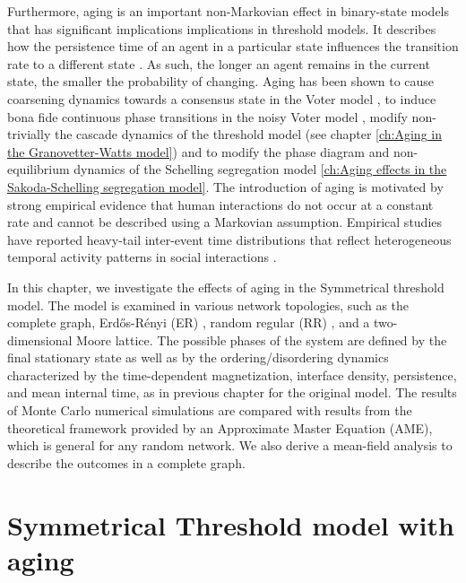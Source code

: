 Furthermore, aging is an important non-Markovian effect in binary-state models that has significant implications implications in threshold models. It describes how the persistence time of an agent in a particular state influences the transition rate to a different state \cite{stark-2008, fernandez-gracia-2011, perez-2016, boguna-2014, chen-2020}. As such, the longer an agent remains in the current state, the smaller the probability of changing. Aging has been shown to cause coarsening dynamics towards a consensus state in the Voter model \cite{fernandez-gracia-2011,peralta-2020C}, to induce bona fide continuous phase transitions in the noisy Voter model \cite{artime-2018,peralta-2020A}, modify non-trivially the cascade dynamics of the threshold model (see chapter \ref{ch:Aging in the Granovetter-Watts model}) and to modify the phase diagram and non-equilibrium dynamics of the Schelling segregation model \ref{ch:Aging effects in the Sakoda-Schelling segregation model}. The introduction of aging is motivated by strong empirical evidence that human interactions do not occur at a constant rate and cannot be described using a Markovian assumption. Empirical studies have reported heavy-tail inter-event time distributions that reflect heterogeneous temporal activity patterns in social interactions \cite{karsai-2011, rybski-2009, zignani-2016, artime-2017, kumar-2020}.
	
In this chapter, we investigate the effects of aging in the Symmetrical threshold model. The model is examined in various network topologies, such as the complete graph, Erd\H{o}s-Rényi (ER)  \cite{erdos1960evolution}, random regular (RR) \cite{wormald1999models}, and a two-dimensional Moore lattice. The possible phases of the system are defined by the final stationary state as well as by the ordering/disordering dynamics characterized by the time-dependent magnetization, interface density, persistence, and mean internal time, as in previous chapter for the original model. The results of Monte Carlo numerical simulations are compared with results from the theoretical framework provided by an Approximate Master Equation (AME), which is general for any random network. We also derive a mean-field analysis to describe the outcomes in a complete graph.
	
\section{\label{Symmetrical Threshold model with aging} Symmetrical Threshold model with aging}
	
